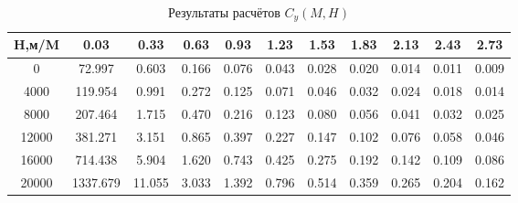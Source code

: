 \begin{table}[H]
\centering
\caption{Результаты расчётов $C_y(M,H)$}
\label{Cy}
\begin{tabular}{|c|c|c|c|c|c|c|c|c|c|c|}
\toprule
H,м/M &      0.03 &    0.33 &   0.63 &   0.93 &   1.23 &   1.53 &   1.83 &   2.13 &   2.43 &   2.73 \\
\midrule
0     &    72.997 &   0.603 &  0.166 &  0.076 &  0.043 &  0.028 &  0.020 &  0.014 &  0.011 &  0.009 \\
4000  &   119.954 &   0.991 &  0.272 &  0.125 &  0.071 &  0.046 &  0.032 &  0.024 &  0.018 &  0.014 \\
8000  &   207.464 &   1.715 &  0.470 &  0.216 &  0.123 &  0.080 &  0.056 &  0.041 &  0.032 &  0.025 \\
12000 &   381.271 &   3.151 &  0.865 &  0.397 &  0.227 &  0.147 &  0.102 &  0.076 &  0.058 &  0.046 \\
16000 &   714.438 &   5.904 &  1.620 &  0.743 &  0.425 &  0.275 &  0.192 &  0.142 &  0.109 &  0.086 \\
20000 &  1337.679 &  11.055 &  3.033 &  1.392 &  0.796 &  0.514 &  0.359 &  0.265 &  0.204 &  0.162 \\
\bottomrule
\end{tabular}
\end{table}
